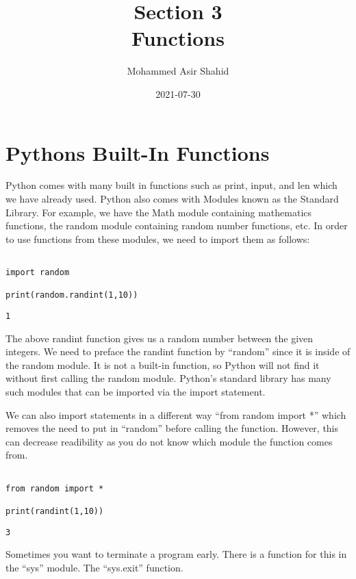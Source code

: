 \documentclass[11pt]{article}
\author{Mohammed Asir Shahid}
\date{2021-07-30}
\title{Section 3\\\medskip
\large Functions}
\begin{document}
\maketitle
\tableofcontents


\section{Pythons Built-In Functions}
\label{sec:org0369cda}

Python comes with many built in functions such as print, input, and len which we have already used. Python also comes with Modules known as the Standard Library. For example, we have the Math module containing mathematics functions, the random module containing random number functions, etc. In order to use functions from these modules, we need to import them as follows:

\begin{verbatim}

import random

print(random.randint(1,10))

\end{verbatim}

\begin{verbatim}
1
\end{verbatim}


The above randint function gives us a random number between the given integers. We need to preface the randint function by ``random'' since it is inside of the random module. It is not a built-in function, so Python will not find it without first calling the random module. Python's standard library has many such modules that can be imported via the import statement.

We can also import statements in a different way ``from random import *'' which removes the need to put in ``random'' before calling the function. However, this can decrease readibility as you do not know which module the function comes from.

\begin{verbatim}

from random import *

print(randint(1,10))

\end{verbatim}

\begin{verbatim}
3
\end{verbatim}


Sometimes you want to terminate a program early. There is a function for this in the ``sys'' module. The ``sys.exit'' function.
\end{document}

